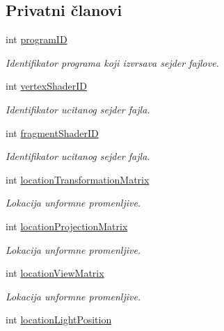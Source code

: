 \subsection*{Privatni članovi}
\begin{DoxyCompactItemize}
\item 
int \hyperlink{classshader_1_1AnimatedModelShader_a3ca1350c79b88746827a4284ec63cabe}{program\+ID}
\begin{DoxyCompactList}\small\item\em Identifikator programa koji izvrsava sejder fajlove. \end{DoxyCompactList}\item 
int \hyperlink{classshader_1_1AnimatedModelShader_aaca0cca7c6f00ba7bc43725ec5338f24}{vertex\+Shader\+ID}
\begin{DoxyCompactList}\small\item\em Identifikator ucitanog sejder fajla. \end{DoxyCompactList}\item 
int \hyperlink{classshader_1_1AnimatedModelShader_a813f2815f75ec8e129c6e8c461acbc74}{fragment\+Shader\+ID}
\begin{DoxyCompactList}\small\item\em Identifikator ucitanog sejder fajla. \end{DoxyCompactList}\item 
int \hyperlink{classshader_1_1AnimatedModelShader_a0cf85738b0897a28a205bcddbbb87c44}{location\+Transformation\+Matrix}
\begin{DoxyCompactList}\small\item\em Lokacija unformne promenljive. \end{DoxyCompactList}\item 
int \hyperlink{classshader_1_1AnimatedModelShader_a627ba9dc3ff999c20c3b7e055d67d07a}{location\+Projection\+Matrix}
\begin{DoxyCompactList}\small\item\em Lokacija unformne promenljive. \end{DoxyCompactList}\item 
int \hyperlink{classshader_1_1AnimatedModelShader_a71f489d448baef3809a10b78c1c52ab5}{location\+View\+Matrix}
\begin{DoxyCompactList}\small\item\em Lokacija unformne promenljive. \end{DoxyCompactList}\item 
int \hyperlink{classshader_1_1AnimatedModelShader_a4d4674bc1a859486049637974b171269}{location\+Light\+Position}

\end{DoxyCompactItemize}

